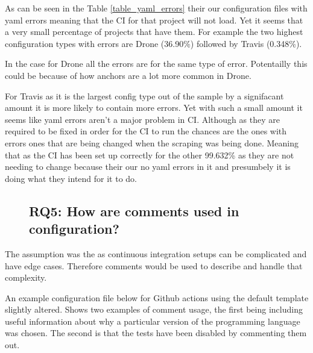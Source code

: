\documentclass[twoside,12pt,titlepage,a4paper]{article}
\begin{document}


As can be seen in the Table \ref{table_yaml_errors} their our configuration files with yaml errors meaning that the CI for that project will not load. Yet it seems that a very small percentage of projects that have them. For example the two highest configuration types with errors are Drone (36.90\%) followed by Travis (0.348\%).

In the case for Drone all the errors are for the same type of error. Potentailly this could be because of how anchors are a lot more common in Drone.

For Travis as it is the largest config type out of the sample by a signifacant amount it is more likely to contain more errors. Yet with such a small amount it seems like yaml errors aren't a major problem in CI. Although as they are required to be fixed in order for the CI to run the chances are the ones with errors ones that are being changed when the scraping was being done. Meaning that as the CI has been set up correctly for the other 99.632\% as they are not needing to change because their our no yaml errors in it and presumbely it is doing what they intend for it to do.


\pagebreak
\begin{figure}[!ht]
  \vspace*{-0.05in}
  \subsection{\textbf{RQ5}: How are comments used in configuration?}
  \label{section:RQ5}
  \vspace*{-0.05in}
\end{figure}


The assumption was the as continuous integration setups can be complicated and have edge cases. Therefore comments would be used to describe and handle that complexity.

An example configuration file below for Github actions using the default template slightly altered. Shows two examples of comment usage, the first being including useful information about why a particular version of the programming language was chosen. The second is that the tests have been disabled by commenting them out. 
\end{document}
